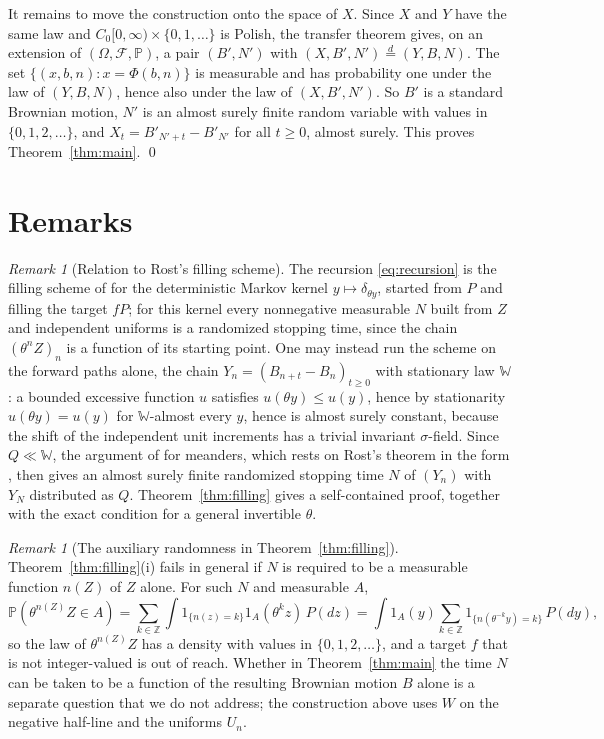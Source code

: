\documentclass[11pt]{amsart}
\theoremstyle{remark}
\newtheorem{remark}[theorem]{Remark}
\numberwithin{equation}{section}
\newcommand{\Pp}{\mathbb P}
\newcommand{\Z}{\mathbb Z}
\newcommand{\Wi}{\mathbb W}
\begin{document}
It remains to move the construction onto the space of $X$. Since $X$ and $Y$ have the same law and $C_0[0,\infty)\times\{0,1,\dots\}$ is Polish, the transfer theorem \cite[Theorem~6.10]{Ka} gives, on an extension of $(\Omega,\mathcal F,\Pp)$, a pair $(B',N')$ with $(X,B',N')\overset{d}{=}(Y,B,N)$. The set $\{(x,b,n):x=\Phi(b,n)\}$ is measurable and has probability one under the law of $(Y,B,N)$, hence also under the law of $(X,B',N')$. So $B'$ is a standard Brownian motion, $N'$ is an almost surely finite random variable with values in $\{0,1,2,\dots\}$, and $X_t=B'_{N'+t}-B'_{N'}$ for all $t\ge0$, almost surely. This proves Theorem~\ref{thm:main}. \qed

\section{Remarks}\label{sec:remarks}

\begin{remark}[Relation to Rost's filling scheme]\label{rem:rost}
The recursion \eqref{eq:recursion} is the filling scheme of \cite{CO,Rost71a} for the deterministic Markov kernel $y\mapsto\delta_{\theta y}$, started from $P$ and filling the target $fP$; for this kernel every nonnegative measurable $N$ built from $Z$ and independent uniforms is a randomized stopping time, since the chain $(\theta^nZ)_n$ is a function of its starting point. One may instead run the scheme on the forward paths alone, the chain $Y_n=(B_{n+t}-B_n)_{t\ge0}$ with stationary law $\Wi$: a bounded excessive function $u$ satisfies $u(\theta y)\le u(y)$, hence by stationarity $u(\theta y)=u(y)$ for $\Wi$-almost every $y$, hence is almost surely constant, because the shift of the independent unit increments has a trivial invariant $\sigma$-field. Since $Q\ll\Wi$, the argument of \cite[Section~3.5]{PT-patterns} for meanders, which rests on Rost's theorem in the form \cite[Chapter~IX, no.~69]{DM}, then gives an almost surely finite randomized stopping time $N$ of $(Y_n)$ with $Y_N$ distributed as $Q$. Theorem~\ref{thm:filling} gives a self-contained proof, together with the exact condition for a general invertible $\theta$.
\end{remark}

\begin{remark}[The auxiliary randomness in Theorem~\ref{thm:filling}]\label{rem:integer}
Theorem~\ref{thm:filling}(i) fails in general if $N$ is required to be a measurable function $n(Z)$ of $Z$ alone. For such $N$ and measurable $A$,
\[
\Pp(\theta^{n(Z)}Z\in A)=\sum_{k\in\Z}\int1_{\{n(z)=k\}}1_A(\theta^kz)\,P(dz)=\int1_A(y)\sum_{k\in\Z}1_{\{n(\theta^{-k}y)=k\}}\,P(dy),
\]
so the law of $\theta^{n(Z)}Z$ has a density with values in $\{0,1,2,\dots\}$, and a target $f$ that is not integer-valued is out of reach. Whether in Theorem~\ref{thm:main} the time $N$ can be taken to be a function of the resulting Brownian motion $B$ alone is a separate question that we do not address; the construction above uses $W$ on the negative half-line and the uniforms $U_n$.
\end{remark}
\end{document}
